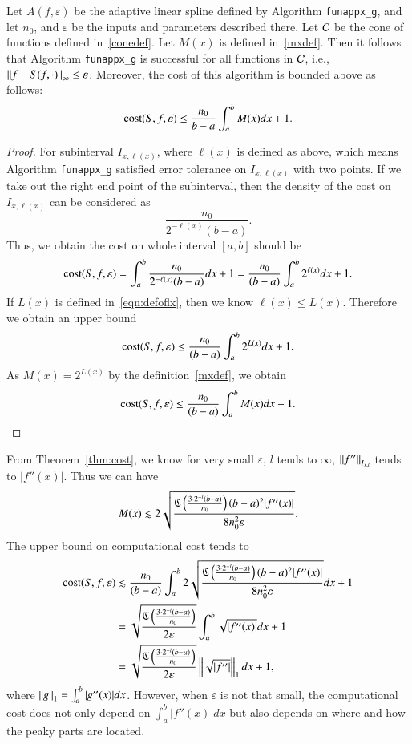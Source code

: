 \begin{theorem}\label{thm:cost}
Let $A(f,\varepsilon)$ be the adaptive linear spline defined by Algorithm \textnormal{\texttt{funappx\_g}}, and let $n_0$, and $\varepsilon$ be the inputs and parameters described there. Let $\cc$ be the cone of functions defined in~\eqref{conedef}.
Let $M(x)$ is defined in~\eqref{mxdef}.
Then it follows that Algorithm \textnormal{\texttt{funappx\_g}} is successful for all functions in $\cc$,  i.e.,  $\norm[\infty]{f - S(f, \cdot)} \le \varepsilon$.  Moreover, the cost of this algorithm is bounded above as follows:
$$\cost(S,f,\varepsilon) \le \frac{n_0}{b-a}\int_a^b M(x) dx +1.$$
\end{theorem}

\begin{proof}
For subinterval $I_{x,\ell(x)}$, where $\ell(x)$ is defined as above,
which means Algorithm \texttt{funappx\_g} satisfied error tolerance on $I_{x,\ell(x)}$ with two points.
If we take out the right end point of the subinterval, then the density of the cost on $I_{x,\ell(x)}$ can be considered as
$$\frac{n_0}{2^{-\ell(x)}(b-a)}.$$
Thus, we obtain the cost on whole interval $[a,b]$ should be
$$\cost(S,f,\varepsilon)  = \int_a^b \frac{n_0}{2^{-\ell(x)}(b-a)}dx +1= \frac{n_0}{(b-a)}\int_a^b 2^{\ell(x)}dx +1.
$$
If $L(x)$ is defined in~\eqref{eqn:defoflx}, then we know $\ell(x) \le L(x)$. Therefore we obtain an upper bound
$$\cost(S,f,\varepsilon)  \le \frac{n_0}{(b-a)}\int_a^b 2^{L(x)}dx +1.
$$
As $M(x)=2^{L(x)}$ by the definition~\eqref{mxdef}, we obtain
$$\cost(S,f,\varepsilon)  \le \frac{n_0}{(b-a)}\int_a^b M(x) dx +1.
$$
\end{proof}

From Theorem~\ref{thm:cost}, we know for very small $\varepsilon$,
$l$ tends to $\infty$, $ \norm[\bar{I}_{x,l}]{f''} $ tends to $|f''(x)|$.
Thus we can have
$$ M(x) \lesssim 2\sqrt{\frac{\fC\left(\frac{3 \cdot 2^{-l}(b-a)}{n_0}\right)  (b-a)^2 |f''(x)|}{8n^2_0\varepsilon}}.$$
The upper bound on computational cost tends to
\begin{align*}
\cost(S,f,\varepsilon)  & \lesssim \frac{n_0}{(b-a)}\int_a^b 2\sqrt{\frac{\fC\left(\frac{3 \cdot 2^{-l}(b-a)}{n_0}\right)  (b-a)^2 |f''(x)|}{8n^2_0\varepsilon}} dx +1 \\
& =\sqrt{\frac{\fC\left(\frac{3 \cdot 2^{-l}(b-a)}{n_0}\right)}{2\varepsilon}}\int_a^b \sqrt{|f''(x)|} dx +1\\
& =\sqrt{\frac{\fC\left(\frac{3 \cdot 2^{-l}(b-a)}{n_0}\right)}{2\varepsilon}}\norm[1]{\sqrt{|f''|}} dx +1,
\end{align*}
where $\norm[1]{g}=\int_a^b |g''(x)| dx$.
However, when $\varepsilon$ is not that small, the computational cost does not only depend on $\int_a^b|f''(x)|dx$ but also depends on where and how the peaky parts are located.\\
